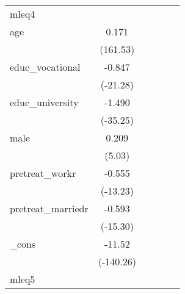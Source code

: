 {\begin{tabular}{l*{5}{c}}
\hline
mleq4       &                     &                     &                     &                     &                     \\
age         &       0.171\sym{***}&                     &                     &                     &                     \\
            &    (161.53)         &                     &                     &                     &                     \\
[1em]
educ\_vocational&      -0.847\sym{***}&                     &                     &                     &                     \\
            &    (-21.28)         &                     &                     &                     &                     \\
[1em]
educ\_university&      -1.490\sym{***}&                     &                     &                     &                     \\
            &    (-35.25)         &                     &                     &                     &                     \\
[1em]
male        &       0.209\sym{***}&                     &                     &                     &                     \\
            &      (5.03)         &                     &                     &                     &                     \\
[1em]
pretreat\_workr&      -0.555\sym{***}&                     &                     &                     &                     \\
            &    (-13.23)         &                     &                     &                     &                     \\
[1em]
pretreat\_marriedr&      -0.593\sym{***}&                     &                     &                     &                     \\
            &    (-15.30)         &                     &                     &                     &                     \\
[1em]
\_cons      &      -11.52\sym{***}&                     &                     &                     &                     \\
            &   (-140.26)         &                     &                     &                     &                     \\
\hline
mleq5       &                     &                     &                     &                     &                     \\

\end{tabular}}
